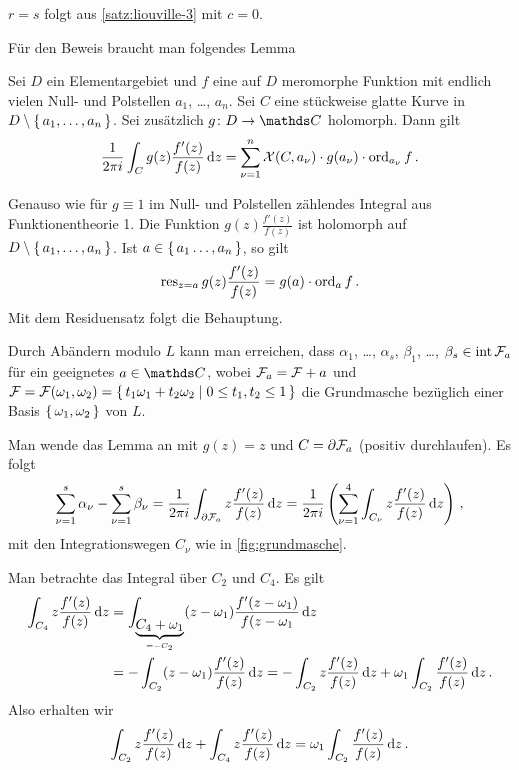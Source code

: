 \begin{bewe-list}
\item $r=s$ folgt aus \autoref{satz:liouville-3} mit $c=0$.

\item Für den Beweis braucht man folgendes Lemma
\vspace{-4em}
\begin{lemm-ind}
Sei $D$ ein Elementargebiet und $f$ eine auf $D$ meromorphe Funktion mit endlich vielen Null- und Polstellen $a_1$, \ldots, $a_n$. Sei $C$ eine stückweise glatte Kurve in $D\setminus\left\{\,a_1, \ldots, a_n\,\right\}$.
Sei zusätzlich $g\colon D \ra \CC$ holomorph. Dann gilt
\[
	\frac{1}{2\pi i} \int_C g(z) \frac{f'(z)}{f(z)} \,\mathrm{d} z
	= \sum_{\nu=1}^n \mathcal{X}(C, a_\nu) \cdot g(a_\nu) \cdot \operatorname{ord}_{a_\nu} f
	\,.
\]
\end{lemm-ind}
\begin{bewe-ind}
Genauso wie für $g\equiv1$ im Null- und Polstellen zählendes Integral aus Funktionentheorie 1.
Die Funktion $g(z) \frac{f'(z)}{f(z)}$ ist holomorph auf $D\setminus\left\{\,a_1, \ldots, a_n\,\right\}$.
Ist $a\in\left\{\,a_1\ldots,a_n\,\right\}$, so gilt
\[
	\operatorname{res}_{z=a} g(z)\frac{f'(z)}{f(z)}
	= g(a) \cdot \operatorname{ord}_a f
	\,.
\]
Mit dem Residuensatz folgt die Behauptung.
\end{bewe-ind}

Durch Abändern modulo $L$ kann man erreichen, dass $\alpha_1$, \ldots, $\alpha_s$, $\beta_1$, \ldots, $\beta_s \in \operatorname{int} \mathcal{F}_a$ für ein geeignetes $a\in\CC$, wobei $\mathcal{F}_a = \mathcal{F} + a$ und $\mathcal{F} = \mathcal{F}(\omega_1, \omega_2) = \left\{\,t_1\omega_1 + t_2\omega_2 \mid 0 \leq t_1, t_2 \leq 1\,\right\}$ die Grundmasche bezüglich einer Basis $\left\{\,\omega_1, \omega_2\,\right\}$ von $L$.

Man wende das Lemma an mit $g(z) = z$ und $C = \partial \mathcal{F}_a$ (positiv durchlaufen). Es folgt
\[
	\sum_{\nu = 1}^s \alpha_\nu - \sum_{\nu = 1}^s \beta_\nu
	= \frac{1}{2\pi i} \int_{\partial \mathcal{F}_a} z \frac{f'(z)}{f(z)} \,\mathrm{d} z
	= \frac{1}{2\pi i} \left( \sum_{\nu = 1}^4 \int_{C_\nu} z \frac{f'(z)}{f(z)} \,\mathrm{d} z\right)
	\,,
\]
mit den Integrationswegen $C_\nu$ wie in \autoref{fig:grundmasche}.

Man betrachte das Integral über $C_2$ und $C_4$.
Es gilt
\begin{align*}
	\int_{C_4} z \frac{f'(z)}{f(z)} \,\mathrm{d} z
	&= \int_{\underbrace{C_4 + \omega_1}_{=-C_2}} (z-\omega_1) \frac{f'(z-\omega_1)}{f(z-\omega_1} \,\mathrm{d} z \\
	&= -\int_{C_2} (z-\omega_1) \frac{f'(z)}{f(z)} \,\mathrm{d} z
	= -\int_{C_2} z\frac{f'(z)}{f(z)} \,\mathrm{d} z + \omega_1 \int_{C_2} \frac{f'(z)}{f(z)} \,\mathrm{d} z
	\,.
\end{align*}
Also erhalten wir
\[
	\int_{C_2} z \frac{f'(z)}{f(z)} \,\mathrm{d} z + \int_{C_4} z \frac{f'(z)}{f(z)} \,\mathrm{d} z
	= \omega_1 \int_{C_2} \frac{f'(z)}{f(z)} \,\mathrm{d} z
	\,.
\]


\end{bewe-list}

